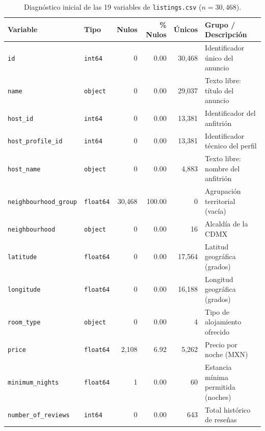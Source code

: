 \documentclass[12pt,letterpaper,oneside]{report}
\begin{document}
\begin{table}[htbp]
\centering
\caption{Diagnóstico inicial de las 19 variables de \texttt{listings.csv} ($n = 30{,}468$).}
\label{tab:diccionario_inicial}
\scriptsize
\renewcommand{\arraystretch}{1.15}
\begin{tabularx}{\textwidth}{l l r r r Y}
\toprule
{}
\textbf{Variable} & \textbf{Tipo} & \textbf{Nulos} & \textbf{\% Nulos} & \textbf{Únicos} & \textbf{Grupo / Descripción} \\
\midrule
\texttt{id}                             & \texttt{int64}   &      0 &   0.00 & 30,468 & Identificador único del anuncio \\
\texttt{name}                           & \texttt{object}  &      0 &   0.00 & 29,037 & Texto libre: título del anuncio \\
\texttt{host\_id}                       & \texttt{int64}   &      0 &   0.00 & 13,381 & Identificador del anfitrión \\
\texttt{host\_profile\_id}              & \texttt{int64}   &      0 &   0.00 & 13,381 & Identificador técnico del perfil \\
\texttt{host\_name}                     & \texttt{object}  &      0 &   0.00 &  4,883 & Texto libre: nombre del anfitrión \\
\texttt{neighbourhood\_group}           & \texttt{float64} & 30,468 & 100.00 &      0 & Agrupación territorial (vacía) \\
\texttt{neighbourhood}                  & \texttt{object}  &      0 &   0.00 &     16 & Alcaldía de la CDMX \\
\texttt{latitude}                       & \texttt{float64} &      0 &   0.00 & 17,564 & Latitud geográfica (grados) \\
\texttt{longitude}                      & \texttt{float64} &      0 &   0.00 & 16,188 & Longitud geográfica (grados) \\
\texttt{room\_type}                     & \texttt{object}  &      0 &   0.00 &      4 & Tipo de alojamiento ofrecido \\
\texttt{price}                          & \texttt{float64} &  2,108 &   6.92 &  5,262 & Precio por noche (MXN) \\
\texttt{minimum\_nights}                & \texttt{float64} &      1 &   0.00 &     60 & Estancia mínima permitida (noches) \\
\texttt{number\_of\_reviews}            & \texttt{int64}   &      0 &   0.00 &    643 & Total histórico de reseñas \\

\end{tabularx}
\end{table}
\end{document}
